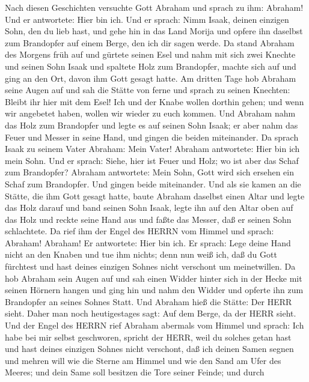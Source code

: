  Nach diesen Geschichten versuchte Gott Abraham und sprach
zu ihm: Abraham! Und er antwortete: Hier bin ich.  Und er
sprach: Nimm Isaak, deinen einzigen Sohn, den du lieb hast, und gehe hin
in das Land Morija und opfere ihn daselbst zum Brandopfer auf einem
Berge, den ich dir sagen werde.  Da stand Abraham des
Morgens früh auf und gürtete seinen Esel und nahm mit sich zwei Knechte
und seinen Sohn Isaak und spaltete Holz zum Brandopfer, machte sich auf
und ging an den Ort, davon ihm Gott gesagt hatte.  Am
dritten Tage hob Abraham seine Augen auf und sah die Stätte von ferne
 und sprach zu seinen Knechten: Bleibt ihr hier mit dem
Esel! Ich und der Knabe wollen dorthin gehen; und wenn wir angebetet
haben, wollen wir wieder zu euch kommen.  Und Abraham nahm
das Holz zum Brandopfer und legte es auf seinen Sohn Isaak; er aber nahm
das Feuer und Messer in seine Hand, und gingen die beiden miteinander.
 Da sprach Isaak zu seinem Vater Abraham: Mein Vater!
Abraham antwortete: Hier bin ich mein Sohn. Und er sprach: Siehe, hier
ist Feuer und Holz; wo ist aber das Schaf zum Brandopfer? 
Abraham antwortete: Mein Sohn, Gott wird sich ersehen ein Schaf zum
Brandopfer. Und gingen beide miteinander.  Und als sie kamen
an die Stätte, die ihm Gott gesagt hatte, baute Abraham daselbst einen
Altar und legte das Holz darauf und band seinen Sohn Isaak, legte ihn
auf den Altar oben auf das Holz  und reckte seine Hand aus
und faßte das Messer, daß er seinen Sohn schlachtete.  Da
rief ihm der Engel des HERRN vom Himmel und sprach: Abraham! Abraham! Er
antwortete: Hier bin ich.  Er sprach: Lege deine Hand nicht
an den Knaben und tue ihm nichts; denn nun weiß ich, daß du Gott
fürchtest und hast deines einzigen Sohnes nicht verschont um
meinetwillen.  Da hob Abraham sein Augen auf und sah einen
Widder hinter sich in der Hecke mit seinen Hörnern hangen und ging hin
und nahm den Widder und opferte ihn zum Brandopfer an seines Sohnes
Statt.  Und Abraham hieß die Stätte: Der HERR sieht. Daher
man noch heutigestages sagt: Auf dem Berge, da der HERR sieht.
 Und der Engel des HERRN rief Abraham abermals vom Himmel
 und sprach: Ich habe bei mir selbst geschworen, spricht
der HERR, weil du solches getan hast und hast deines einzigen Sohnes
nicht verschont,  daß ich deinen Samen segnen und mehren
will wie die Sterne am Himmel und wie den Sand am Ufer des Meeres; und
dein Same soll besitzen die Tore seiner Feinde;  und durch

